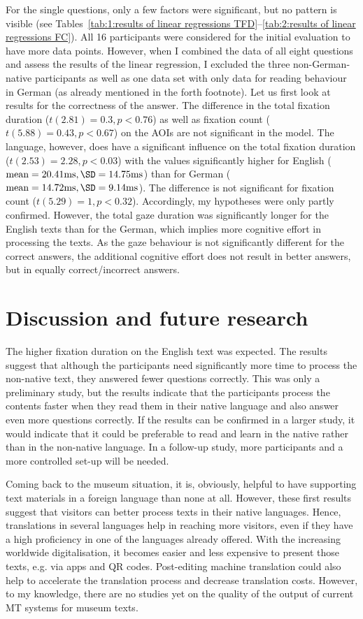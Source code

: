 \documentclass[output=paper]{langscibook}
\begin{document}
For the single questions, only a few factors were significant, but no pattern is visible (see Tables~\ref{tab:1:results of linear regressions TFD}--\ref{tab:2:results of linear regressions FC}). All 16 participants were considered for the initial evaluation to have more data points. However, when I combined the data of all eight questions and assess the results of the linear regression, I excluded the three non-German-native participants as well as one data set with only data for reading behaviour in German (as already mentioned in the forth footnote). Let us first look at results for the correctness of the answer. The difference in the total fixation duration ($t(2.81)=0.3, p<0.76$) as well as fixation count ($t(5.88)=0.43, p<0.67$) on the AOIs are not significant in the model. The language, however, does have a significant influence on the total fixation duration ($t(2.53)=2.28, p<0.03$) with the values significantly higher for English ($\text{mean}=20.41\text{ms}, \SD=14.75\text{ms}$) than for German ($\text{mean}=14.72\text{ms}, \SD=9.14\text{ms}$). The difference is not significant for fixation count ($t(5.29)=1, p<0.32$). Accordingly, my hypotheses were only partly confirmed. However, the total gaze duration was significantly longer for the English texts than for the German, which implies more cognitive effort in processing the texts. As the gaze behaviour is not significantly different for the correct answers, the additional cognitive effort does not result in better answers, but in equally correct/incorrect answers.

 \section{Discussion and future research}
 
The higher fixation duration on the English text was expected. The results suggest that although the participants need significantly more time to process the non-native text, they answered fewer questions correctly. This was only a preliminary study, but the results indicate that the participants process the contents faster when they read them in their native language and also answer even more questions correctly. If the results can be confirmed in a larger study, it would indicate that it could be preferable to read and learn in the native rather than in the non-native language. In a follow-up study, more participants and a more controlled set-up will be needed.

Coming back to the museum situation, it is, obviously, helpful to have supporting text materials in a foreign language than none at all. However, these first results suggest that visitors can better process texts in their native languages. Hence, translations in several languages help in reaching more visitors, even if they have a high proficiency in one of the languages already offered. With the increasing worldwide digitalisation, it becomes easier and less expensive to present those texts, e.g. via apps and QR codes. Post-editing machine translation could also help to accelerate the translation process and decrease translation costs. However, to my knowledge, there are no studies yet on the quality of the output of current MT systems for museum texts.
\end{document}
